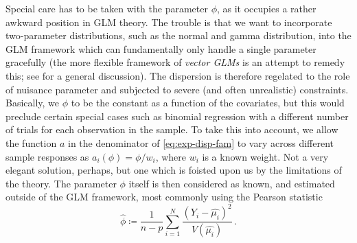 \documentclass[a4paper]{book}
\begin{document}
Special care has to be taken with the parameter $\phi$, as it occupies a rather awkward position in GLM theory. The trouble is that we want to incorporate two-parameter distributions, such as the normal and gamma distribution, into the GLM framework which can fundamentally only handle a single parameter gracefully (the more flexible framework of \emph{vector GLMs} is an attempt to remedy this; see \cite[Chapter 2]{yee} for a general discussion). The dispersion is therefore regelated to the role of nuisance parameter and subjected to severe (and often unrealistic) constraints. Basically, we $\phi$ to be the constant as a function of the covariates, but this would preclude certain special cases such as binomial regression with a different number of trials for each observation in the sample. To take this into account, we allow the function $a$ in the denominator of \cref{eq:exp-disp-fam} to vary across different sample responses as $a_i(\phi) = \phi / w_i$, where $w_i$ is a known weight. Not a very elegant solution, perhaps, but one which is foisted upon us by the limitations of the theory. The parameter $\phi$ itself is then considered as known, and estimated outside of the GLM framework, most commonly using the Pearson statistic
\begin{equation}
  \widehat{\phi} \coloneqq \frac{1}{n - p} \sum_{i = 1}^N \frac{(Y_i - \widehat{\mu_i})^2}{V(\widehat{\mu_i})} \,.
\end{equation}
\end{document}
